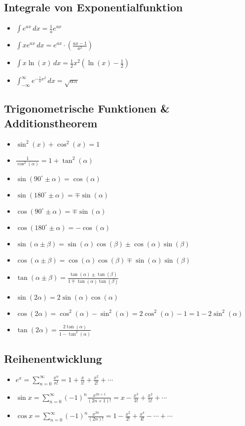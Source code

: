 \begin{multicols}{2}
\subsection{Integrale von Exponentialfunktion}
\begin{itemize}[leftmargin=*]
  	\item $\int e^{ax} \,dx = \frac{1}{a} e^{ax}$ 
	\item $\int x e^{ax} \,dx = e^{ax} \cdot \left ( \frac{ax - 1}{a^2} \right )$
	\item $\int x \ln(x) \,dx = \frac{1}{2} x^2 (\ln(x) - \frac{1}{2})$
	\item $\int_{-\infty}^\infty e^{-\frac{1}{a}x^2} \,dx = \sqrt{a \pi}$
\end{itemize}

\subsection{Trigonometrische Funktionen \& Additionstheorem}
\begin{itemize}[leftmargin=*]
	\item $\sin^2(x) + \cos^2(x) = 1$
	\item $\frac{1}{\cos^2(\alpha)} = 1 + \tan^2(\alpha)$
	\item $\sin(90^\circ \pm \alpha) = \cos(\alpha)$
	\item $\sin(180^\circ \pm \alpha) = \mp \sin(\alpha)$
	\item $\cos(90^\circ \pm \alpha) = \mp \sin(\alpha)$
	\item $\cos(180^\circ \pm \alpha) = - \cos(\alpha)$
	\item $\sin(\alpha \pm \beta) = \sin(\alpha)\cos(\beta) \pm
	\cos(\alpha)\sin(\beta)$
	\item $\cos(\alpha \pm \beta) = \cos(\alpha)\cos(\beta) \mp \sin(\alpha)
	\sin(\beta)$
	\item $\tan(\alpha \pm \beta) = \frac{\tan(\alpha) \pm \tan(\beta)}{1 \mp
	\tan(\alpha)\tan(\beta)}$
	\item $\sin(2\alpha) = 2 \sin(\alpha)\cos(\alpha)$
	\item $\cos(2\alpha) = \cos^2(\alpha) - \sin^2(\alpha) = 2 \cos^2(\alpha) - 1
	= 1 - 2 \sin^2(\alpha)$
	\item $\tan(2\alpha) = \frac{2 \tan(\alpha)}{1 - \tan^2(\alpha)}$
\end{itemize}

\subsection{Reihenentwicklung}
\begin{itemize}[leftmargin=*]
	\item $e^x = \sum_{n=0}^\infty \frac{x^n}{n!} = 1 + \frac{x}{1!} +
	\frac{x^2}{2!} + \cdots$
	\item $\sin x = \sum_{n=0}^\infty (-1)^n \frac{x^{2n + 1}}{(2n + 1)!} = x -
	\frac{x^3}{3!} + \frac{x^2}{5!} + \cdots$
	\item $\cos x = \sum_{n=0}^\infty (-1)^n \frac{x^{2n}}{(2n)!} = 1 -
	\frac{x^2}{2!} + \frac{x^4}{4!} - \cdots + \cdots$
\end{itemize}


\end{multicols}
